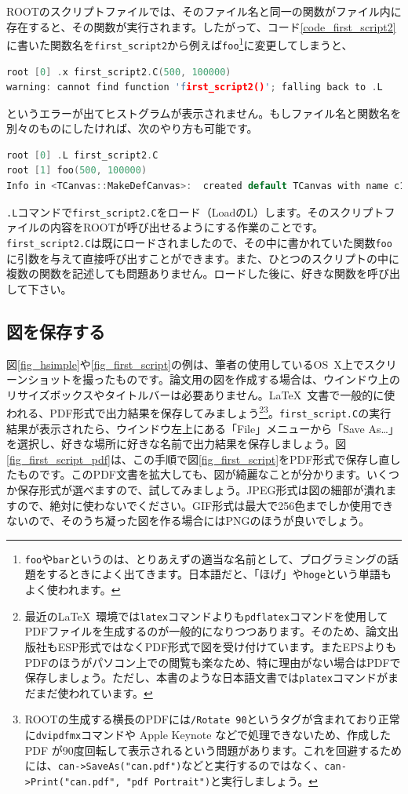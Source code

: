 ROOTのスクリプトファイルでは、そのファイル名と同一の関数がファイル内に存在すると、その関数が実行されます。したがって、コード\ref{code_first_script2}に書いた関数名を\texttt{first\_script2}から例えば\texttt{foo}\footnote{\texttt{foo}や\texttt{bar}というのは、とりあえずの適当な名前として、プログラミングの話題をするときによく出てきます。日本語だと、「ほげ」や\texttt{hoge}という単語もよく使われます。}に変更してしまうと、
\begin{lstlisting}[language=c++]
root [0] .x first_script2.C(500, 100000)
warning: cannot find function 'first_script2()'; falling back to .L
\end{lstlisting}
というエラーが出てヒストグラムが表示されません。もしファイル名と関数名を別々のものにしたければ、次のやり方も可能です。
\begin{lstlisting}[language=c++]
root [0] .L first_script2.C
root [1] foo(500, 100000)
Info in <TCanvas::MakeDefCanvas>:  created default TCanvas with name c1
\end{lstlisting}
\texttt{.L}コマンドで\texttt{first\_script2.C}をロード（LoadのL）します。そのスクリプトファイルの内容をROOTが呼び出せるようにする作業のことです。\texttt{first\_script2.C}は既にロードされましたので、その中に書かれていた関数\texttt{foo}に引数を与えて直接呼び出すことができます。また、ひとつのスクリプトの中に複数の関数を記述しても問題ありません。ロードした後に、好きな関数を呼び出して下さい。
\subsection{図を保存する}

図\ref{fig_hsimple}や\ref{fig_first_script}の例は、筆者の使用しているOS~X上でスクリーンショットを撮ったものです。論文用の図を作成する場合は、ウインドウ上のリサイズボックスやタイトルバーは必要ありません。\LaTeX\ 文書で一般的に使われる、PDF形式で出力結果を保存してみましょう\footnote{最近の\LaTeX\ 環境では\texttt{latex}コマンドよりも\texttt{pdflatex}コマンドを使用してPDFファイルを生成するのが一般的になりつつあります。そのため、論文出版社もESP形式ではなくPDF形式で図を受け付けています。またEPSよりもPDFのほうがパソコン上での閲覧も楽なため、特に理由がない場合はPDFで保存しましょう。ただし、本書のような日本語文書では\texttt{platex}コマンドがまだまだ使われています。}\footnote{ROOTの生成する横長のPDFには\texttt{/Rotate 90}というタグが含まれており正常に\texttt{dvipdfmx}コマンドや Apple Keynote などで処理できないため、作成した PDF が90度回転して表示されるという問題があります。これを回避するためには、\texttt{can->SaveAs("can.pdf")}などと実行するのではなく、\texttt{can->Print("can.pdf", "pdf Portrait")}と実行しましょう。}。\texttt{first\_script.C}の実行結果が表示されたら、ウインドウ左上にある「File」メニューから「Save As\ldots」を選択し、好きな場所に好きな名前で出力結果を保存しましょう。図\ref{fig_first_script_pdf}は、この手順で図\ref{fig_first_script}をPDF形式で保存し直したものです。このPDF文書を拡大しても、図が綺麗なことが分かります。いくつか保存形式が選べますので、試してみましょう。JPEG形式は図の細部が潰れますので、絶対に使わないでください。GIF形式は最大で256色までしか使用できないので、そのうち凝った図を作る場合にはPNGのほうが良いでしょう。

